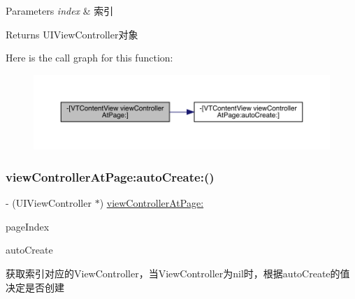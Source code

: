 \begin{DoxyParams}{Parameters}
{\em index} & 索引\\
\hline
\end{DoxyParams}
\begin{DoxyReturn}{Returns}
U\+I\+View\+Controller对象 
\end{DoxyReturn}
Here is the call graph for this function\+:\nopagebreak
\begin{figure}[H]
\begin{center}
\leavevmode
\includegraphics[width=350pt]{interface_v_t_content_view_ae81362c80f8f700ad3c69d814da4ca9b_cgraph}
\end{center}
\end{figure}
\mbox{\label{interface_v_t_content_view_a688090ca86d8df39124c8720eb72e496}} 
\subsubsection{\texorpdfstring{view\+Controller\+At\+Page\+:auto\+Create\+:()}{viewControllerAtPage:autoCreate:()}\hspace{0.1cm}{\footnotesize\ttfamily [1/3]}}
{\footnotesize\ttfamily -\/ (U\+I\+View\+Controller $\ast$) \mbox{\hyperlink{interface_v_t_content_view_ae81362c80f8f700ad3c69d814da4ca9b}{view\+Controller\+At\+Page\+:}} \begin{DoxyParamCaption}\item[{(N\+S\+U\+Integer)}]{page\+Index }\item[{autoCreate:(B\+O\+OL)}]{auto\+Create }\end{DoxyParamCaption}}

获取索引对应的\+View\+Controller，当\+View\+Controller为nil时，根据auto\+Create的值决定是否创建


